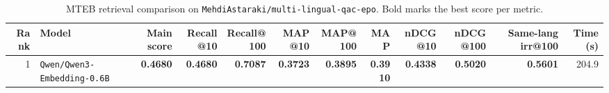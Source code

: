 \begin{table}[t]
\centering
\small
\begin{tabular}{r l r r r r r r r r r r}
\hline
Rank & Model & Main score & Recall@10 & Recall@100 & MAP@10 & MAP@100 & MAP & nDCG@10 & nDCG@100 & Same-lang irr@100 & Time (s) \\
\hline
1 & \texttt{Qwen/Qwen3-Embedding-0.6B} & \textbf{0.4680} & \textbf{0.4680} & \textbf{0.7087} & \textbf{0.3723} & \textbf{0.3895} & \textbf{0.3910} & \textbf{0.4338} & \textbf{0.5020} & \textbf{0.5601} & 204.9 \\
\hline
\end{tabular}
\caption{MTEB retrieval comparison on \texttt{MehdiAstaraki/multi-lingual-qac-epo}. Bold marks the best score per metric.}
\label{tab:mteb-model-comparison}
\end{table}
